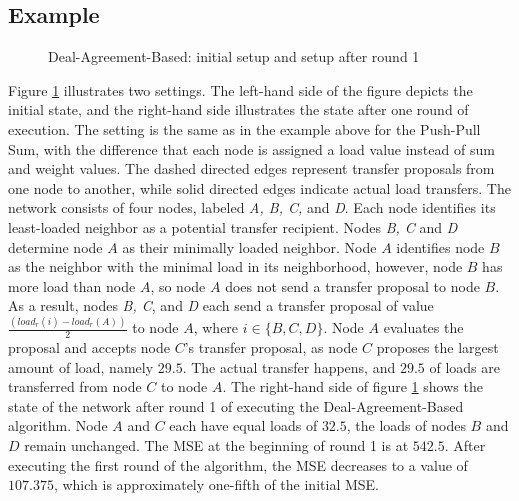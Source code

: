 \subsection{Example}\label{subsec:exampleDAB}
 \begin{figure}
    \centering
    \scalebox{0.75}{}
    \caption{Deal-Agreement-Based: initial setup and setup after round 1}
    \label{fig:DABExampleAlgo}
 \end{figure}
 Figure \ref{fig:DABExampleAlgo} illustrates two settings. The left-hand side of the figure depicts the initial state, and the right-hand side illustrates the state after one round of execution. The setting is the same as in the example above for the Push-Pull Sum, with the difference that each node is assigned a load value instead of sum and weight values. The dashed directed edges represent transfer proposals from one node to another, while solid directed edges indicate actual load transfers. The network consists of four nodes, labeled \textit{A, B, C,} and \textit{D}. Each node identifies its least-loaded neighbor as a potential transfer recipient. Nodes \textit{B, C} and \textit{D} determine node $A$ as their minimally loaded neighbor. Node $A$ identifies node $B$ as the neighbor with the minimal load in its neighborhood, however, node $B$ has more load than node $A$, so node $A$ does not send a transfer proposal to node $B$. As a result, nodes \textit{B, C}, and \textit{D} each send a transfer proposal of value $\frac{(load_r(i)-load_r(A))}{2}$ to node $A$, where $i \in \{B,C,D\}$. Node $A$ evaluates the proposal and accepts node $C$'s transfer proposal, as node $C$ proposes the largest amount of load, namely $29.5$. The actual transfer happens, and $29.5$ of loads are transferred from node $C$ to node $A$. The right-hand side of figure \ref{fig:DABExampleAlgo} shows the state of the network after round 1 of executing the Deal-Agreement-Based algorithm. Node $A$ and $C$ each have equal loads of $32.5$, the loads of nodes $B$ and $D$ remain unchanged. The MSE at the beginning of round 1 is at $542.5$. After executing the first round of the algorithm, the MSE decreases to a value of $107.375$, which is approximately one-fifth of the initial MSE.

